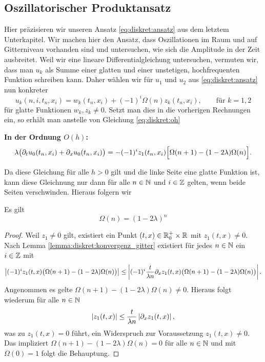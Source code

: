 \subsection {Oszillatorischer Produktansatz}\label{sec:osz}

Hier präzisieren wir unseren Ansatz \eqref{eq:diskret:ansatz} aus dem letztem Unterkapitel. %
Wir machen hier den Ansatz, dass Oszillationen im Raum und auf Gitterniveau vorhanden sind und untersuchen, wie sich die Amplitude in der Zeit ausbreitet.
Weil wir eine lineare Differentialgleichung untersuchen, vermuten wir, dass man $u_k$ als Summe einer glatten und einer unstetigen, hochfrequenten Funktion schreiben kann.
Daher wählen wir für $u_1$ und $u_2$ aus \eqref{eq:diskret:ansatz} nun konkreter 
\[ 
u_k(n, i, t_n, x_i) = w_k(t_n, x_i) + (-1)^i \Omega(n) z_k(t_n, x_i), \qquad \text{für $k = 1,2$}
\]
für glatte Funktionen $w_k, z_k \neq 0$.
Setzt man dies in die vorherigen Rechnungen ein, so erhält man anstelle von Gleichung \eqref{eq:diskret:oh}

\vspace{0.4cm}
\noindent \textbf{In der Ordnung $O(h)$:}
\begin{align}\label{eq:osz:o1} %
\lambda \bigl( \partial_t u_0(t_n, x_i) + \partial_x u_0(t_n, x_i) \bigr) = - (-1)^i z_1(t_n, x_i) \Bigl[ \Omega(n+1) - ( 1 - 2 \lambda ) \Omega(n) \Bigr].
\end{align}

Da diese Gleichung für alle $h > 0$ gilt und die linke Seite eine glatte Funktion ist, kann diese Gleichnung nur dann für alle $n \in \mathbb N$ und $i \in \mathbb Z$ gelten, wenn beide Seiten verschwinden.
Hieraus folgern wir
\begin{satz}\label{satz:omega_n}
Es gilt
\[ \Omega(n) = (1 - 2 \lambda)^n \]
\end{satz}
\begin{proof}
Weil $z_1 \neq 0$ gilt, existiert ein Punkt $(t,x) \in \mathbb R^+_0 \times \mathbb R$ mit $z_1(t,x) \neq 0$.
Nach Lemma \ref{lemma:diskret:konvergenz_gitter} existiert für jedes $n \in \mathbb N$ ein $i \in \mathbb Z$ mit
\[  \left| (-1)^i z_1(t, x) \bigl( \Omega(n+1) - ( 1 - 2 \lambda ) \Omega(n) \bigr) \right| \leq \left| (-1)^i \frac {t}{\lambda n} \partial_x z_1(t, x) \bigl( \Omega(n+1) - ( 1 - 2 \lambda ) \Omega(n) \bigr) \right|. \]
Angenommen es gelte $\Omega(n+1) - ( 1 - 2 \lambda ) \Omega(n) \neq 0$.
Hieraus folgt wiederum für alle $n \in \mathbb N$
\[ \left| z_1(t, x) \right| \leq \frac {t}{\lambda n} \left| \partial_x z_1(t,x) \right|, \]
was zu $z_1(t,x) = 0$ führt, ein Widerspruch zur Voraussetzung $z_1(t,x) \neq 0$.
Das impliziert $\Omega(n+1) - ( 1 - 2 \lambda ) \Omega(n) = 0$ für alle $n \in \mathbb N$ und mit $\Omega(0) = 1$ folgt die Behauptung.
\end{proof}


